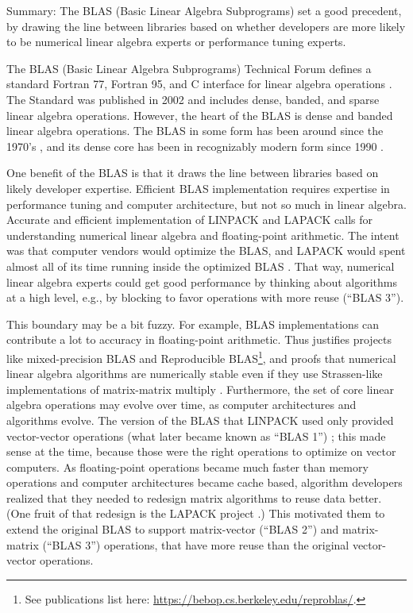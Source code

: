 Summary: The BLAS (Basic Linear Algebra Subprograms) set a good
precedent, by drawing the line between libraries based on whether
developers are more likely to be numerical linear algebra experts or
performance tuning experts.

The BLAS (Basic Linear Algebra Subprograms) Technical Forum defines a
standard Fortran 77, Fortran 95, and C interface for linear algebra
operations \cite{BLAS-standard}.  The Standard was published in 2002
and includes dense, banded, and sparse linear algebra operations.
However, the heart of the BLAS is dense and banded linear algebra
operations.  The BLAS in some form has been around since the 1970's
\cite{lawson1979blas,dongarra2005history}, and its dense core has been
in recognizably modern form since 1990 \cite{dongarra1990blas3}.

One benefit of the BLAS is that it draws the line between libraries
based on likely developer expertise.  Efficient BLAS implementation
requires expertise in performance tuning and computer architecture,
but not so much in linear algebra.  Accurate and efficient
implementation of LINPACK and LAPACK calls for understanding numerical
linear algebra and floating-point arithmetic.  The intent was that
computer vendors would optimize the BLAS, and LAPACK would spent
almost all of its time running inside the optimized BLAS \cite[``The
BLAS as the Key to Portability'']{LAPACK-Users-Guide}.  That way,
numerical linear algebra experts could get good performance by
thinking about algorithms at a high level, e.g., by blocking to favor
operations with more reuse (``BLAS 3'').

This boundary may be a bit fuzzy.  For example, BLAS implementations
can contribute a lot to accuracy in floating-point arithmetic.  Thus
justifies projects like mixed-precision BLAS \cite{lawn149} and
Reproducible BLAS\footnote{See publications list here:
  \url{https://bebop.cs.berkeley.edu/reproblas/}.}, and proofs that
numerical linear algebra algorithms are numerically stable even if
they use Strassen-like implementations of matrix-matrix multiply
\cite{demmel2007fast}.  Furthermore, the set of core linear algebra
operations may evolve over time, as computer architectures and
algorithms evolve.  The version of the BLAS that LINPACK used only
provided vector-vector operations (what later became known as ``BLAS
1'') \cite{lawson1979blas}; this made sense at the time, because those
were the right operations to optimize on vector computers.  As
floating-point operations became much faster than memory operations
\cite{wulf1995hitting} and computer architectures became cache based,
algorithm developers realized that they needed to redesign matrix
algorithms to reuse data better.  (One fruit of that redesign is the
LAPACK project \cite{anderson1990lapack}.)  This motivated them to
extend the original BLAS to support matrix-vector
\cite{dongarra1988blas2} (``BLAS 2'') and matrix-matrix
\cite{dongarra1990blas3} (``BLAS 3'') operations, that have more reuse
than the original vector-vector operations.

